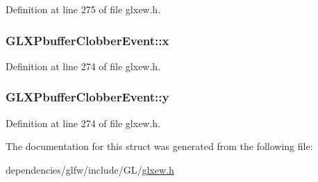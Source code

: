 Definition at line 275 of file glxew.\-h.

\hypertarget{struct_g_l_x_pbuffer_clobber_event_a8f0a7162a033c89ee94ce535580dbc32}{
\subsubsection[{x}]{ G\-L\-X\-Pbuffer\-Clobber\-Event\-::x}}\label{struct_g_l_x_pbuffer_clobber_event_a8f0a7162a033c89ee94ce535580dbc32}


Definition at line 274 of file glxew.\-h.

\hypertarget{struct_g_l_x_pbuffer_clobber_event_a69eb7ac60d36ac3ec4550ac206cfc61f}{
\subsubsection[{y}]{ G\-L\-X\-Pbuffer\-Clobber\-Event\-::y}}\label{struct_g_l_x_pbuffer_clobber_event_a69eb7ac60d36ac3ec4550ac206cfc61f}


Definition at line 274 of file glxew.\-h.



The documentation for this struct was generated from the following file\-:\begin{DoxyCompactItemize}
\item 
dependencies/glfw/include/\-G\-L/\hyperlink{glxew_8h}{glxew.\-h}\end{DoxyCompactItemize}
